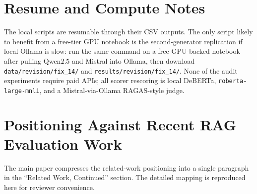 \documentclass[11pt]{article}
\begin{document}
\section{Resume and Compute Notes}
\label{supp:kaggle}

The local scripts are resumable through their CSV outputs. The only
script likely to benefit from a free-tier GPU notebook is the
second-generator replication if local Ollama is slow: run the same
command on a free GPU-backed notebook after pulling Qwen$2.5$ and
Mistral into Ollama, then download \texttt{data/revision/fix\_14/} and
\texttt{results/revision/fix\_14/}. None of the audit experiments
require paid APIs; all scorer rescoring is local DeBERTa,
\texttt{roberta-large-mnli}, and a Mistral-via-Ollama RAGAS-style
judge.

\section{Positioning Against Recent RAG Evaluation Work}
\label{supp:related_positioning}

The main paper compresses the related-work positioning into a single
paragraph in the ``Related Work, Continued'' section. The detailed
mapping is reproduced here for reviewer convenience.
\end{document}
